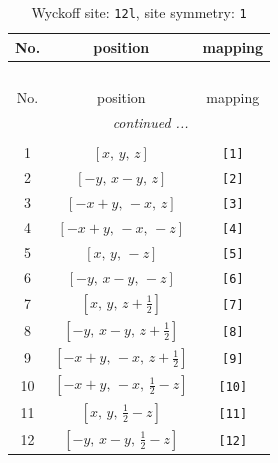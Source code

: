 \documentclass[fleqn,8pt]{jsarticle}
\begin{document}
\begin{longtable}{ccc}
\caption{Wyckoff site: {\tt 12l}, site symmetry: {\tt 1}}
 \\
 \hline \hline
No. & position & mapping \\ \hline \endfirsthead

\multicolumn{2}{l}{\tablename\ \thetable{}} \\
 \hline \hline
No. & position & mapping \\ \hline \endhead

 \hline \hline
\multicolumn{2}{r}{\footnotesize\it continued ...} \\ \endfoot

 \hline \hline
\multicolumn{2}{r}{} \\ \endlastfoot

1 & $\left[ x,\, y,\, z \right]$ & {\tt [1]} \\ \hline
2 & $\left[ - y,\, x - y,\, z \right]$ & {\tt [2]} \\ \hline
3 & $\left[ - x + y,\, - x,\, z \right]$ & {\tt [3]} \\ \hline
4 & $\left[ - x + y,\, - x,\, - z \right]$ & {\tt [4]} \\ \hline
5 & $\left[ x,\, y,\, - z \right]$ & {\tt [5]} \\ \hline
6 & $\left[ - y,\, x - y,\, - z \right]$ & {\tt [6]} \\ \hline
7 & $\left[ x,\, y,\, z + \frac{1}{2} \right]$ & {\tt [7]} \\ \hline
8 & $\left[ - y,\, x - y,\, z + \frac{1}{2} \right]$ & {\tt [8]} \\ \hline
9 & $\left[ - x + y,\, - x,\, z + \frac{1}{2} \right]$ & {\tt [9]} \\ \hline
10 & $\left[ - x + y,\, - x,\, \frac{1}{2} - z \right]$ & {\tt [10]} \\ \hline
11 & $\left[ x,\, y,\, \frac{1}{2} - z \right]$ & {\tt [11]} \\ \hline
12 & $\left[ - y,\, x - y,\, \frac{1}{2} - z \right]$ & {\tt [12]} \\
\end{longtable}
\end{document}
